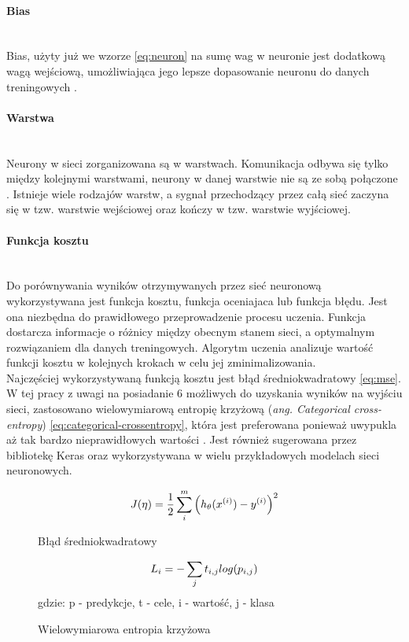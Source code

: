 \paragraph{Bias} \mbox{}\\
Bias, użyty już we wzorze \ref{eq:neuron} na sumę wag w neuronie jest dodatkową wagą wejściową,
umożliwiająca jego lepsze dopasowanie neuronu do danych treningowych \cite{needForBias}.

\paragraph{Warstwa} \mbox{}\\
Neurony w sieci zorganizowana są w warstwach. Komunikacja odbywa się tylko między kolejnymi
warstwami, neurony w danej warstwie nie są ze sobą połączone \cite{CS231n, substBigConv}.
Istnieje wiele rodzajów warstw, a sygnał przechodzący przez całą sieć zaczyna się w tzw.
warstwie wejściowej oraz kończy w tzw. warstwie wyjściowej.

\paragraph{Funkcja kosztu} \mbox{}\\
Do porównywania wyników otrzymywanych przez sieć neuronową wykorzystywana jest funkcja kosztu,
funkcja oceniajaca lub funkcja błędu. Jest ona niezbędna do prawidłowego przeprowadzenie
procesu uczenia. Funkcja dostarcza informacje o różnicy między obecnym
stanem sieci, a optymalnym rozwiązaniem dla danych treningowych. Algorytm uczenia
analizuje wartość funkcji kosztu w kolejnych krokach w celu jej zminimalizowania.\\
Najczęściej wykorzystywaną funkcją kosztu jest błąd średniokwadratowy \ref{eq:mse}.
W tej pracy z uwagi na posiadanie 6 możliwych do uzyskania wyników na wyjściu sieci,
zastosowano wielowymiarową entropię krzyżową (\textit{ang. Categorical cross-entropy}) \ref{eq:categorical-crossentropy},
która jest preferowana ponieważ uwypukla aż tak bardzo nieprawidłowych wartości \cite{whyNotMSE}. Jest również
sugerowana przez bibliotekę Keras oraz wykorzystywana w wielu przykładowych modelach sieci neuronowych.
\begin{figure}[h!]
\renewcommand{\figurename}{Wzór}%
\begin{equation} \label{eq:mse}
J(\eta) = \frac {1}{2} \sum_{i}^{m} \Big(h_{\theta}(x^{(i)}) - y^{(i)} \Big)^2\\
\end{equation}
\caption{Błąd średniokwadratowy}
\end{figure}
\begin{figure}[h!]
\renewcommand{\figurename}{Wzór}%
\begin{equation} \label{eq:categorical-crossentropy}
L_{i} = - \sum_{j} t_{i,j} log(p_{i,j})\\
\end{equation}
\centering
gdzie: p - predykcje, t - cele, i - wartość, j - klasa
\caption{Wielowymiarowa entropia krzyżowa}
\end{figure}

